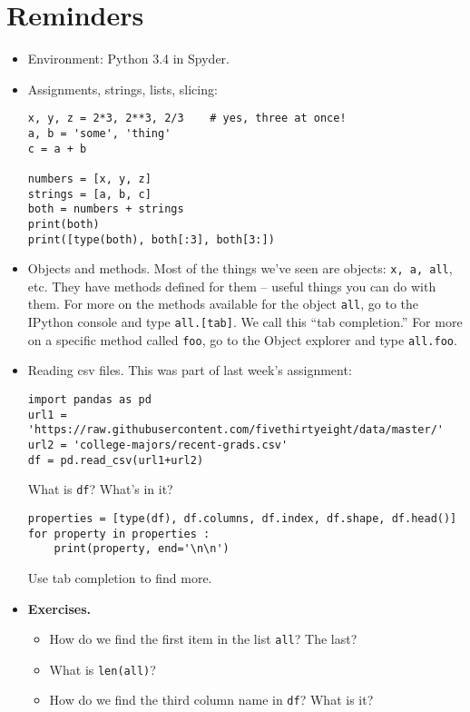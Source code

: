 \documentclass[11pt]{article}
\begin{document}
\section{Reminders}

\begin{itemize}
\item Environment:  Python 3.4 in Spyder.
\item Assignments, strings, lists, slicing:
\begin{verbatim}
x, y, z = 2*3, 2**3, 2/3    # yes, three at once!
a, b = 'some', 'thing'
c = a + b

numbers = [x, y, z]
strings = [a, b, c]
both = numbers + strings
print(both)
print([type(both), both[:3], both[3:])
\end{verbatim}

\item Objects and methods.  Most of the things we've seen are objects:  {\tt x, a, all}, etc.
They have methods defined for them -- useful things you can do with them.
For more on the methods available for the object {\tt all},
go to the IPython console and type {\tt all.[tab]}.
We call this ``tab completion.''
For more on a specific method called {\tt foo},
go to the Object explorer and type {\tt all.foo}.

\item Reading csv files.
This was part of last week's assignment:
\begin{verbatim}
import pandas as pd
url1 = 'https://raw.githubusercontent.com/fivethirtyeight/data/master/'
url2 = 'college-majors/recent-grads.csv'
df = pd.read_csv(url1+url2)
\end{verbatim}
What is {\tt df}?  What's in it?
\begin{verbatim}
properties = [type(df), df.columns, df.index, df.shape, df.head()]
for property in properties :
    print(property, end='\n\n')
\end{verbatim}
Use tab completion to find more.


\item {\bf Exercises.}
\begin{itemize}
\item How do we find the first item in the list {\tt all}?  The last?
\item What is {\tt len(all)}?
\item How do we find the third column name in {\tt df}?  What is it?
\end{itemize}

\end{itemize}
\end{document}
